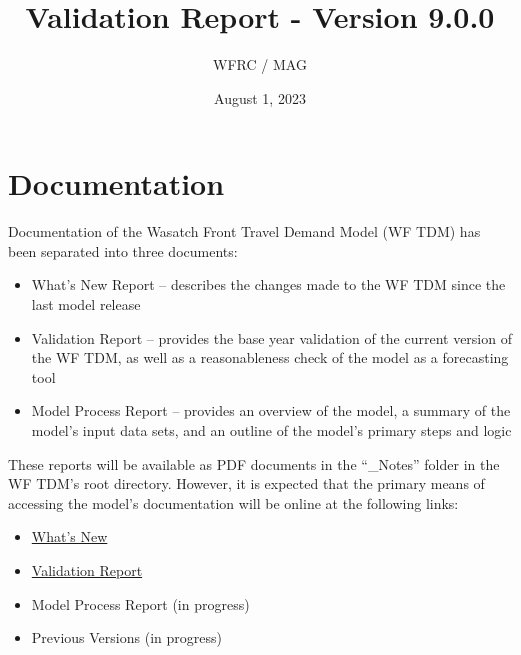 \documentclass[
  letterpaper,
  DIV=11,
  numbers=noendperiod]{scrreprt}
\title{Validation Report - Version 9.0.0}
\author{WFRC / MAG}
\date{August 1, 2023}
\makeatletter
\providecommand{\tightlist}{%
  \setlength{\itemsep}{0pt}\setlength{\parskip}{0pt}}\usepackage{longtable,booktabs,array}
\renewcommand{\maketitle}{\bgroup\setlength{\parindent}{0pt}
  \vspace*{\baselineskip}
  \vspace*{\baselineskip}
  \vspace*{\baselineskip}
  \hspace*{2.3cm} {\sffamily\Huge\textbf{\MakeUppercase{\@title}}} \newline \newline
  \hspace*{2.3cm} \@author \newline \newline
  \hspace*{2.3cm} \@date %
\egroup
}
\renewcommand*\contentsname{Table of contents}
\newcommand\contentsname{Table of contents}
\makeatother
\begin{document}
\maketitle
\pagestyle{mystyle}

\ifdefined\Shaded\renewenvironment{Shaded}{\begin{tcolorbox}[sharp corners, boxrule=0pt, colback={codebgcolor}, breakable, frame hidden, borderline west={3pt}{0pt}{shadecolor}, enhanced]}{\end{tcolorbox}}\fi

\renewcommand*\contentsname{Table of contents}
{
\hypersetup{linkcolor=}
\setcounter{tocdepth}{2}
\tableofcontents
}
\listoffigures
\listoftables
{}

\hypertarget{documentation}{%
\chapter{Documentation}\label{documentation}}

Documentation of the Wasatch Front Travel Demand Model (WF TDM) has been
separated into three documents:

\begin{itemize}
\tightlist
\item
  What's New Report -- describes the changes made to the WF TDM since
  the last model release
\item
  Validation Report -- provides the base year validation of the current
  version of the WF TDM, as well as a reasonableness check of the model
  as a forecasting tool
\item
  Model Process Report -- provides an overview of the model, a summary
  of the model's input data sets, and an outline of the model's primary
  steps and logic
\end{itemize}

These reports will be available as PDF documents in the ``\_Notes''
folder in the WF TDM's root directory. However, it is expected that the
primary means of accessing the model's documentation will be online at
the following links:

\begin{itemize}
\tightlist
\item
  \href{https://wfrc.org/wftdm-docs/v9x/v900/whats-new/1-genparams.html}{What's
  New}
\item
  \href{https://wfrc.org/wftdm-docs/v9x/v900/validation/3-distribute.html}{Validation
  Report}
\item
  Model Process Report (in progress)
\item
  Previous Versions (in progress)
\end{itemize}
\end{document}
